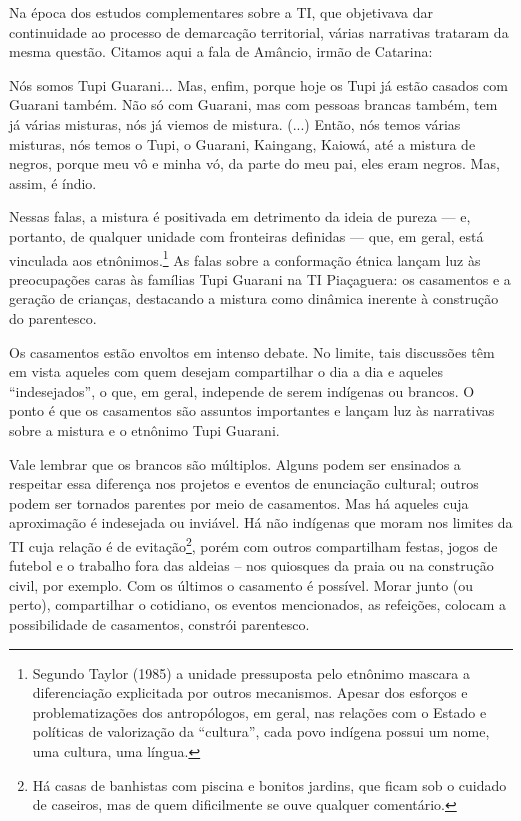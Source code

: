 \documentclass{article}
\begin{document}
Na \'epoca dos estudos complementares sobre a TI, que objetivava dar
continuidade ao processo de demarca\c{c}\~ao territorial, v\'arias
narrativas trataram da mesma quest\~ao. Citamos aqui a fala de
Am\^ancio, irm\~ao de Catarina:

N\'os somos Tupi Guarani... Mas, enfim, porque hoje os Tupi j\'a est\~ao
casados com Guarani tamb\'em. N\~ao s\'o com Guarani, mas com pessoas
brancas tamb\'em, tem j\'a v\'arias misturas, n\'os j\'a viemos de
mistura. (...) Ent\~ao, n\'os temos v\'arias misturas, n\'os temos o
Tupi, o Guarani, Kaingang, Kaiow\'a, at\'e a mistura de negros, porque
meu v\^o e minha v\'o, da parte do meu pai, eles eram negros. Mas,
assim, \'e \'indio. 

Nessas falas, a mistura \'e positivada em detrimento da ideia de pureza
--- e, portanto, de qualquer unidade com fronteiras definidas --- que,
em geral, est\'a vinculada aos etn\^onimos.\footnote{ Segundo Taylor
(1985) a unidade pressuposta pelo etn\^onimo mascara a
diferencia\c{c}\~ao explicitada por outros mecanismos. Apesar dos
esfor\c{c}os e problematiza\c{c}\~oes dos antrop\'ologos, em geral, nas
rela\c{c}\~oes com o Estado e pol\'iticas de valoriza\c{c}\~ao da
{\textquotedblleft}cultura{\textquotedblright}, cada povo ind\'igena
possui um nome, uma cultura, uma l\'ingua.  } As falas sobre a
conforma\c{c}\~ao \'etnica lan\c{c}am luz \`as preocupa\c{c}\~oes caras
\`as fam\'ilias Tupi Guarani na TI Pia\c{c}aguera: os casamentos e a
gera\c{c}\~ao de crian\c{c}as, destacando a mistura como din\^amica
inerente \`a constru\c{c}\~ao do parentesco.

Os casamentos est\~ao envoltos em intenso debate. No limite, tais
discuss\~oes t\^em em vista aqueles com quem desejam compartilhar o dia
a dia e aqueles {\textquotedblleft}indesejados{\textquotedblright}, o
que, em geral, independe de serem ind\'igenas ou brancos. O ponto \'e
que os casamentos s\~ao assuntos importantes e lan\c{c}am luz \`as
narrativas sobre a mistura e o etn\^onimo Tupi Guarani.

Vale lembrar que os brancos s\~ao m\'ultiplos. Alguns podem ser
ensinados a respeitar essa diferen\c{c}a nos projetos e eventos de
enuncia\c{c}\~ao cultural; outros podem ser tornados parentes por meio
de casamentos. Mas h\'a aqueles cuja aproxima\c{c}\~ao \'e indesejada
ou invi\'avel. H\'a n\~ao ind\'igenas que moram nos limites da TI cuja
rela\c{c}\~ao \'e de evita\c{c}\~ao\footnote{ H\'a casas de banhistas
com piscina e bonitos jardins, que ficam sob o cuidado de caseiros, mas
de quem dificilmente se ouve qualquer coment\'ario.}, por\'em com
outros compartilham festas, jogos de futebol e o trabalho fora das
aldeias -- nos quiosques da praia ou na constru\c{c}\~ao civil, por
exemplo. Com os \'ultimos o casamento \'e poss\'ivel. Morar junto (ou
perto), compartilhar o cotidiano, os eventos mencionados, as
refei\c{c}\~oes, colocam a possibilidade de casamentos, constr\'oi
parentesco. 
\end{document}
